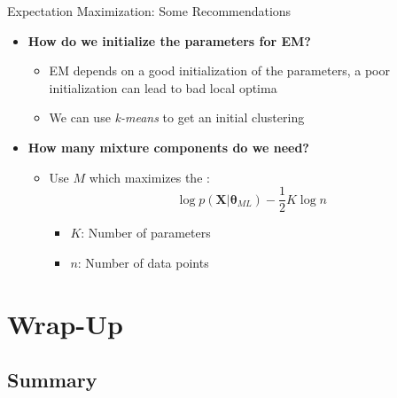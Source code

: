 \begin{frame}{Expectation Maximization: Some Recommendations}{}
	\begin{itemize}
		\item \textbf{How do we initialize the parameters for EM?}
		\begin{itemize}
			\item EM depends on a good initialization of the parameters, a poor initialization can lead to bad local optima
			\item We can use \textit{k-means} to get an initial clustering
		\end{itemize}
		\item \textbf{How many mixture components do we need?}
		\begin{itemize}
			\item Use $M$ which maximizes the :
			\begin{equation}
				\log p(\bm{X} \vert \bm{\theta}_{ML}) - \frac{1}{2} K \log n
			\end{equation}
			\vspace*{-4mm}
			\begin{itemize}
				\item $K$: Number of parameters
				\item $n$: Number of data points
			\end{itemize}
		\end{itemize}
	\end{itemize}
\end{frame}



\section{Wrap-Up}

\subsection{Summary}

